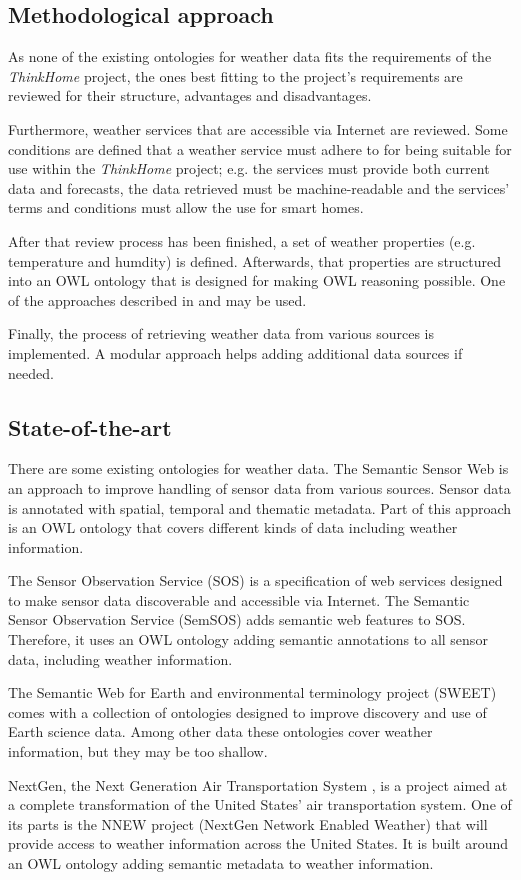 \documentclass{scrartcl}
\begin{document}
\subsection*{Methodological approach}
As none of the existing ontologies for weather data fits the requirements of the \textit{ThinkHome} project, the ones best fitting to the project's requirements are reviewed for their structure, advantages and disadvantages.

Furthermore, weather services that are accessible via Internet are reviewed. Some conditions are defined that a weather service must adhere to for being suitable for use within the \textit{ThinkHome} project; e.g. the services must provide both current data and forecasts, the data retrieved must be machine-readable and the services' terms and conditions must allow the use for smart homes.

After that review process has been finished, a set of weather properties (e.g. temperature and humdity) is defined. Afterwards, that properties are structured into an OWL ontology that is designed for making OWL reasoning possible. One of the approaches described in \cite{Ontology101} and \cite{SoftwareEngineeringOntology} may be used.

Finally, the process of retrieving weather data from various sources is implemented. A modular approach helps adding additional data sources if needed.

\subsection*{State-of-the-art}

There are some existing ontologies for weather data. The Semantic Sensor Web \cite{SemanticSensorWeb} is an approach to improve handling of sensor data from various sources. Sensor data is annotated with spatial, temporal and thematic metadata. Part of this approach is an OWL ontology that covers different kinds of data including weather information.

The Sensor Observation Service (SOS) \cite{SOS} is a specification of web services designed to make sensor data discoverable and accessible via Internet. The Semantic Sensor Observation Service (SemSOS) \cite{SemSOS} adds semantic web features to SOS. Therefore, it uses an OWL ontology adding semantic annotations to all sensor data, including weather information.

The Semantic Web for Earth and environmental terminology project (SWEET) \cite{SWEET} comes with a collection of ontologies designed to improve discovery and use of Earth science data. Among other data these ontologies cover weather information, but they may be too shallow.

NextGen, the Next Generation Air Transportation System \cite{NextGen}, is a project aimed at a complete transformation of the United States' air transportation system. One of its parts is the NNEW project (NextGen Network Enabled Weather) \cite{NNEW} that will provide access to weather information across the United States. It is built around an OWL ontology adding semantic metadata to weather information.



\end{document}
